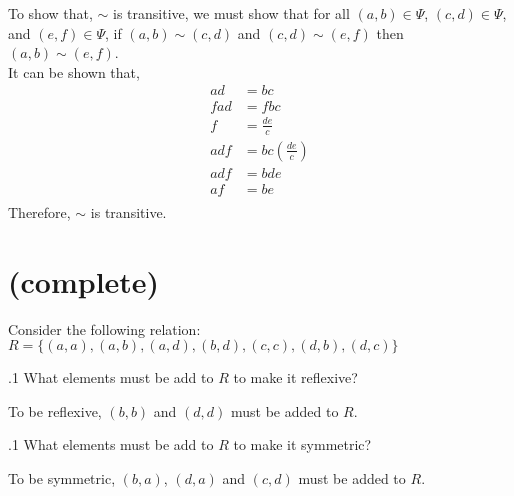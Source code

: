 \documentclass[12pt]{article}
\newenvironment{theorem}[2][Theorem]{\begin{trivlist}
\item[\hskip \labelsep {\bfseries #1}\hskip \labelsep {\bfseries #2.}]}{\end{trivlist}}
\newenvironment{problem}[2][Problem]{\begin{trivlist}
\item[\hskip \labelsep {\bfseries #1}\hskip \labelsep {\bfseries #2.}]}{\end{trivlist}}
\begin{document}
\begin{theorem}{6 Complete but gross}
	To show that, $\sim$ is transitive, we must show that for all $(a,b) \in \Psi$, $(c,d) \in \Psi$, and $(e,f) \in \Psi$, if $(a,b) \sim (c,d)$ and $(c,d) \sim (e,f)$ then $(a,b) \sim (e,f)$.\\
	It can be shown that,
	\begin{align*}
		ad&=bc\\
		fad&=fbc\\
		f&=\frac{de}{c}\\
		adf&=bc(\frac{de}{c})\\
		adf&=bde\\
		af&=be\\
	\end{align*}
	Therefore, $\sim$ is transitive.\\
\end{theorem}
		
\section{(complete)}
\begin{problem}1
	Consider the following relation:\\
	$R = \{(a,a),(a,b),(a,d),(b,d),(c,c),(d,b),(d,c)\}$
\end{problem}
\begin{problem}1.1
 What elements must be add to $R$ to make it reflexive?
\end{problem}
To be reflexive, $(b,b)$ and $(d,d)$ must be added to $R$.
\begin{problem}1.1
 What elements must be add to $R$ to make it symmetric?
\end{problem}
To be symmetric, $(b,a)$, $(d,a)$ and $(c,d)$ must be added to $R$.



 
\end{document}
